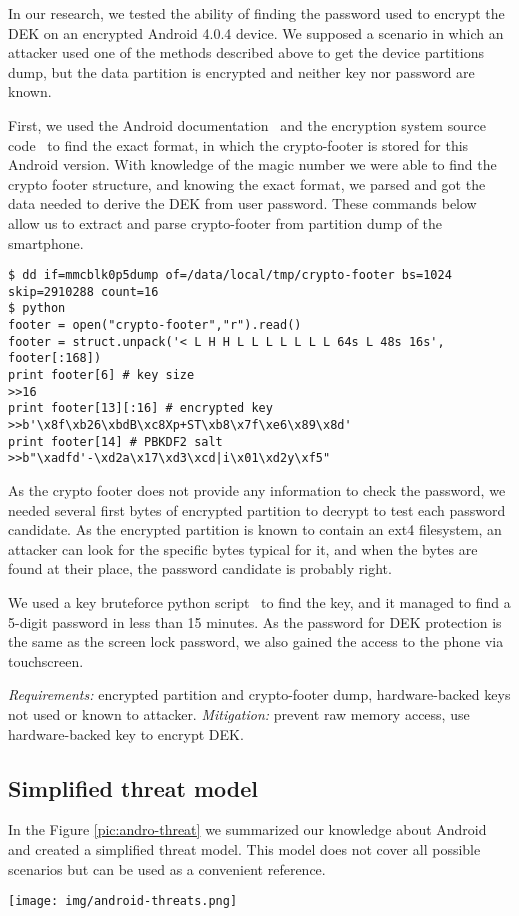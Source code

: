 In our research, we tested the ability of finding the password used to encrypt the DEK on an encrypted Android 4.0.4 device. We supposed a scenario in which an attacker used one of the methods described above to get the device partitions dump, but the data partition is encrypted and neither key nor password are known. 

First, we used the Android documentation~\cite{android2} and the encryption system source code~\cite{andoid5} to find the exact format, in which the crypto-footer is stored for this Android version. With knowledge of the magic number we were able to find the crypto footer structure, and knowing the exact format, we parsed and got the data needed to derive the DEK from user password. 
These commands below allow us to extract and parse crypto-footer from partition dump of the smartphone.

\begin{lstlisting}
$ dd if=mmcblk0p5dump of=/data/local/tmp/crypto-footer bs=1024 skip=2910288 count=16
$ python
footer = open("crypto-footer","r").read()
footer = struct.unpack('< L H H L L L L L L L 64s L 48s 16s', footer[:168])
print footer[6] # key size
>>16
print footer[13][:16] # encrypted key
>>b'\x8f\xb26\xbdB\xc8Xp+ST\xb8\x7f\xe6\x89\x8d'
print footer[14] # PBKDF2 salt
>>b"\xadfd'-\xd2a\x17\xd3\xcd|i\x01\xd2y\xf5"
\end{lstlisting}

As the crypto footer does not provide any information to check the password, we needed several first bytes of encrypted partition to decrypt to test each password candidate. As the encrypted partition is known to contain an ext4 filesystem, an attacker can look for the specific bytes typical for it, and when the bytes are found at their place, the password candidate is probably right.

We used a key bruteforce python script~\cite{android6} to find the key, and it managed to find a 5-digit password in less than 15 minutes. As the password for DEK protection is the same as the screen lock password, we also gained the access to the phone via touchscreen.

\textsl{Requirements:} encrypted partition and crypto-footer dump, hardware-backed keys not used or known to attacker.
\textsl{Mitigation:} prevent raw memory access, use hardware-backed key to encrypt DEK.


\subsection{Simplified threat model}

In the Figure \ref{pic:andro-threat} we summarized our knowledge about Android and created a simplified threat model. This model does not cover all possible scenarios but can be used as a convenient reference.

\begin{figure*}[!t]
\centering
\texttt{[image: img/android-threats.png]}
\caption{Simplified Android threat model}
\label{pic:andro-threat}
\end{figure*}


